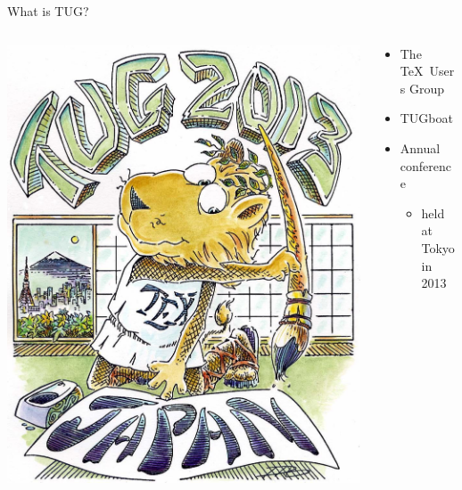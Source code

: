 \documentclass[17pt,dvipdfmx]{beamer}
\begin{document}
\begin{frame}[t]{What is TUG?}
  \bfseries\rmfamily
  \begin{columns}[t]
    \begin{column}{.4\textwidth}
      \vfill
      \hfill\includegraphics[width=.9\textwidth]{tug2013-color.jpg}
    \end{column}
    \begin{column}{.7\textwidth}
    \begin{itemize}
      \item  The \TeX\ Users Group \\
      \item  TUGboat \\
      \item  Annual conference \\
      \begin{itemize}
        \item held at Tokyo in 2013
      \end{itemize}
    \end{itemize}
    \vfill
    \end{column}
  \end{columns}
\end{frame}
\end{document}
